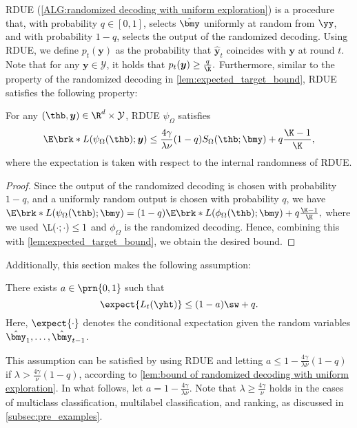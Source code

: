 RDUE (\cref{ALG:randomized decoding with uniform exploration}) is a procedure that, with probability $q \in [0,1]$, selects $\hat{\bmy}$ uniformly at random from $\yy$,  
and with probability $1-q$, selects the output of the randomized decoding.  
Using RDUE, we define $p_t(\bm{y})$ as the probability that $\hat{\bm{y}}_t$ coincides with $\bm{y}$ at round $t$.  
Note that for any $\bm{y} \in \mathcal{Y}$, it holds that  
$
p_t(\bm{y})\geq\frac{q}{\K}.
$
Furthermore, similar to the property of the randomized decoding in \cref{lem:expected_target_bound}, RDUE satisfies the following property:
\begin{lemma}
    \label{lem:bound of randomized decoding with uniform exploration}
    For any $(\thb,\bm{y})\in\R^d\times\mathcal{Y}$, RDUE $\psi_\Omega$ satisfies
    \[
        \E\brk*{L(\psi_\Omega(\thb);\bm{y})}\leq\frac{4\gamma}{\lambda\nu}(1-q)S_\Omega(\thb;\bmy)+q\frac{\K-1}{\K  },
    \]
  where the expectation is taken with respect to the internal randomness of RDUE. 
\end{lemma}
\begin{proof}
Since the output of the randomized decoding is chosen with probability $1-q$,  
and a uniformly random output is chosen with probability $q$, we have  
$
\E\brk*{L(\psi_\Omega(\thb);\bmy)}=(1-q)\E\brk*{L(\phi_\Omega(\thb);\bmy)}+q\frac{\K-1}{\K},
$
where we used $\L(\cdot;\cdot)\leq 1$ and $\phi_\Omega$ is the randomized decoding.  
Hence, combining this with \cref{lem:expected_target_bound}, we obtain the desired bound.
\end{proof}

Additionally, this section makes the following assumption:
\begin{assumption}
    \label{asp:bandit_a}
    There exists $a\in\prn{0,1}$ such that  
    \[
    \expect{L_t(\yht)}\leq(1-a)\sw+q.
    \]  
    Here, $\expect{\cdot}$ denotes the conditional expectation given the random variables $\hat{\bmy}_1,\dots,\hat{\bmy}_{t-1}$.  
\end{assumption}
This assumption can be satisfied by using RDUE and letting   
$a \leq 1-\frac{4\gamma}{\lambda\nu}(1-q)$  
if $\lambda>\frac{4\gamma}{\nu}(1-q)$, according to \cref{lem:bound of randomized decoding with uniform exploration}.  
In what follows, let $a = 1-\frac{4\gamma}{\lambda\nu}$.
Note that $\lambda \geq \frac{4\gamma}{\nu}$ holds in the cases of multiclass classification, multilabel classification, and ranking, as discussed in \cref{subsec:pre_examples}.


